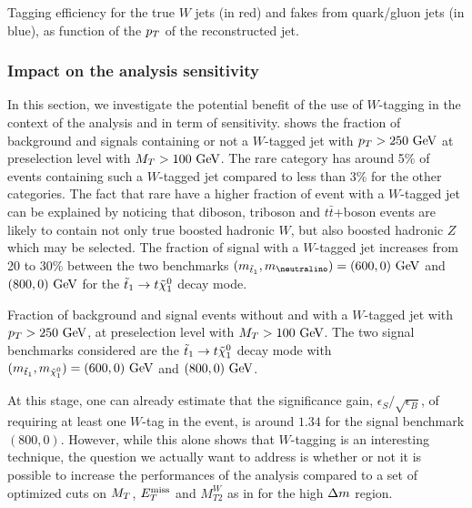                  {Tagging efficiency for the true $W$ jets (in red) and fakes from quark/gluon
                 jets (in blue), as function of the $p_T$ of the reconstructed jet.}

    \subsubsection{Impact on the analysis sensitivity}

    In this section, we investigate the potential benefit of the use of $W$-tagging
    in the context of the analysis and in term of sensitivity. 
    shows the fraction of background and signals containing or not a $W$-tagged jet
    with $p_T > 250~\text{GeV}$ at preselection level with $M_T > 100~\text{GeV}$. The
    rare category has around 5\% of events containing such a $W$-tagged jet compared
    to less than 3\% for the other categories. The fact that rare have a higher
    fraction of event with a $W$-tagged jet can be explained by noticing that
    diboson, triboson and $t\bar{t}$+boson events are likely to contain not only
    true boosted hadronic $W$, but also boosted hadronic $Z$ which may be selected.
    The fraction of signal with a $W$-tagged jet increases from 20 to 30\% between
    the two benchmarks $(\mass{\lstop},\mass{\neutralino}) = (600,0) \GeV$ and
    $(800,0) ~\text{GeV}$ for the $\tilde{t}_1 \rightarrow t \tilde{\chi}_1^0$ decay mode.

                 {Fraction of background and signal events without and with a
                 $W$-tagged jet with $p_T > 250~\text{GeV}$, at preselection level with
                 $M_T > 100~\text{GeV}$. The two signal benchmarks considered are the $\tilde{t}_1
                 \rightarrow t \tilde{\chi}_1^0$ decay mode with
                 $(m_{\tilde{t}_1},m_{\tilde{\chi}_1^0}) = (600,0)~\text{GeV}$ and $(800,0)~\text{GeV}$.}

    At this stage, one can already estimate that the significance gain, $\epsilon_S / \sqrt{\epsilon_B}$,
    of requiring at least one $W$-tag in the event, is around $1.34$ for the
    signal benchmark $(800,0)$. However, while this alone shows that $W$-tagging
    is an interesting technique, the question we actually want to address is whether or not
    it is possible to increase the performances of the analysis compared to a set
    of optimized cuts on $M_T$, $E_T^\text{miss}$ and $M_{T2}^{W}$ as in
     for the high $\Delta m$ region.

